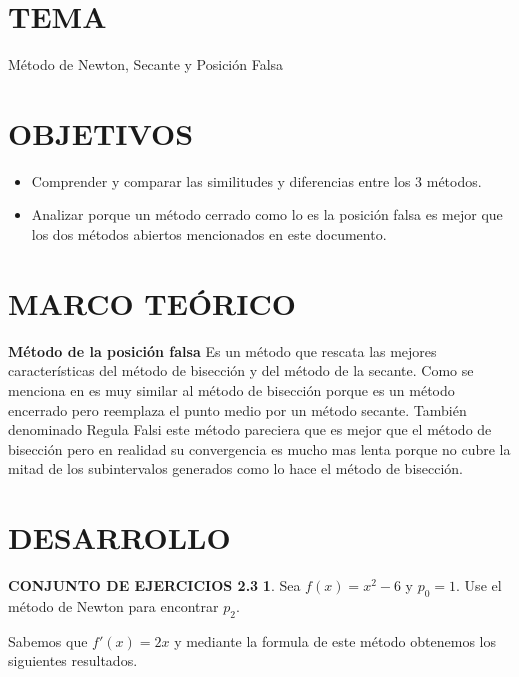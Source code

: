 \documentclass[12pt]{article}
\begin{document}
\section*{TEMA}
Método de Newton, Secante y Posición Falsa

\vspace{0.5cm}

\section*{OBJETIVOS}
\begin{itemize}
    \item Comprender y comparar las similitudes y diferencias entre los 3 métodos.
    \item Analizar porque un método cerrado como lo es la posición falsa es mejor que los dos métodos abiertos mencionados en este documento.

\end{itemize}

\vspace{0.5cm}

\section*{MARCO TEÓRICO}

\textbf{Método de la posición falsa}
\normalsize\newline\newline
Es un método que rescata las mejores características del método de bisección y del método de la secante. 
Como se menciona en \cite{sauer2013analisis} es muy similar al método de bisección porque es un método encerrado pero reemplaza el punto medio por un método secante. 
También denominado Regula Falsi este método pareciera que es mejor que el método de bisección pero en realidad su convergencia es mucho mas lenta porque no cubre la mitad de los subintervalos generados como lo hace el método de bisección.
\vspace{0.5cm}

\section*{DESARROLLO}
\large\textbf{CONJUNTO DE EJERCICIOS 2.3}
\normalsize\newline
\textbf{1}. Sea $f(x) = x^2 - 6$ y $p_0 = 1$. Use el método de Newton para encontrar $p_2$.

Sabemos que $f'(x) = 2x$ y mediante la formula de este método obtenemos los siguientes resultados.
\end{document}
